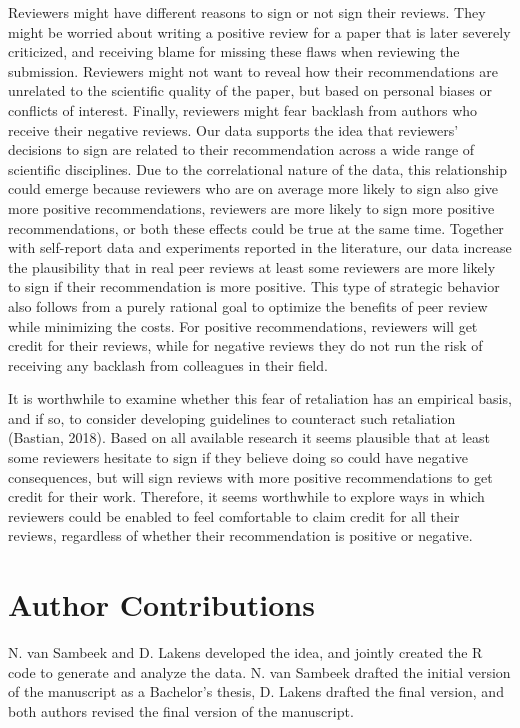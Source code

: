 \documentclass[
  english,
  ,jou, a4paper,floatsintext]{apa6}
\begin{document}
Reviewers might have different reasons to sign or not sign their reviews. They might be worried about writing a positive review for a paper that is later severely criticized, and receiving blame for missing these flaws when reviewing the submission. Reviewers might not want to reveal how their recommendations are unrelated to the scientific quality of the paper, but based on personal biases or conflicts of interest. Finally, reviewers might fear backlash from authors who receive their negative reviews. Our data supports the idea that reviewers' decisions to sign are related to their recommendation across a wide range of scientific disciplines. Due to the correlational nature of the data, this relationship could emerge because reviewers who are on average more likely to sign also give more positive recommendations, reviewers are more likely to sign more positive recommendations, or both these effects could be true at the same time. Together with self-report data and experiments reported in the literature, our data increase the plausibility that in real peer reviews at least some reviewers are more likely to sign if their recommendation is more positive. This type of strategic behavior also follows from a purely rational goal to optimize the benefits of peer review while minimizing the costs. For positive recommendations, reviewers will get credit for their reviews, while for negative reviews they do not run the risk of receiving any backlash from colleagues in their field.

It is worthwhile to examine whether this fear of retaliation has an empirical basis, and if so, to consider developing guidelines to counteract such retaliation (Bastian, 2018). Based on all available research it seems plausible that at least some reviewers hesitate to sign if they believe doing so could have negative consequences, but will sign reviews with more positive recommendations to get credit for their work. Therefore, it seems worthwhile to explore ways in which reviewers could be enabled to feel comfortable to claim credit for all their reviews, regardless of whether their recommendation is positive or negative.

\hypertarget{author-contributions}{%
\section{Author Contributions}\label{author-contributions}}

N. van Sambeek and D. Lakens developed the idea, and jointly created the R code to generate and analyze the data. N. van Sambeek drafted the initial version of the manuscript as a Bachelor's thesis, D. Lakens drafted the final version, and both authors revised the final version of the manuscript.
\end{document}
